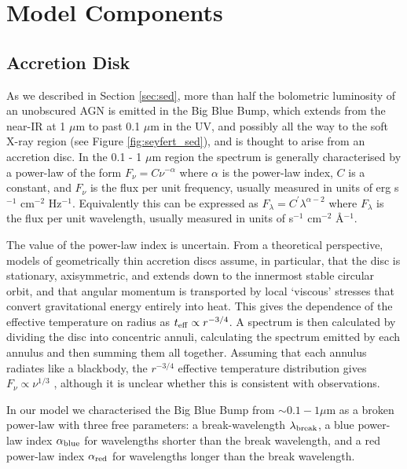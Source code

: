 \section{Model Components}

\subsection{Accretion Disk}

As we described in Section \ref{sec:sed}, more than half the bolometric luminosity of an unobscured AGN is emitted in the Big Blue Bump, which extends from the near-IR at 1 $\mu$m to past 0.1 $\mu$m in the UV, and possibly all the way to the soft X-ray region (see Figure \ref{fig:seyfert_sed}), and is thought to arise from an accretion disc. In the 0.1 - 1 $\mu$m region the spectrum is generally characterised by a power-law of the form $F_\nu = C\nu^{-\alpha}$ where $\alpha$ is the power-law index, $C$ is a constant, and $F_\nu$ is the flux per unit frequency, usually measured in units of erg s$^{-1}$ cm$^{-2}$ Hz$^{-1}$. Equivalently this can be expressed as $F_\lambda = C^\prime\lambda^{\alpha - 2}$ where $F_\lambda$ is the flux per unit wavelength, usually measured in units of s$^{-1}$ cm$^{-2}$ \AA$^{-1}$. 

The value of the power-law index is uncertain. From a theoretical perspective, models of geometrically thin accretion discs \citep{shakura73} assume, in particular, that the disc is stationary, axisymmetric, and extends down to the innermost stable circular orbit, and that angular momentum is transported by local `viscous' stresses that convert gravitational energy entirely into heat. This gives the dependence of the effective temperature on radius as $t_{\rm eff} \propto r^{-3/4}$. A spectrum is then calculated by dividing the disc into concentric annuli, calculating the spectrum emitted by each annulus and then summing them all together. Assuming that each annulus radiates like a blackbody, the $r^{-3/4}$ effective temperature distribution gives $F_\nu \propto \nu^{1/3}$ \citep{peterson95}, although it is unclear whether this is consistent with observations.    

In our model we characterised the Big Blue Bump from $\sim 0.1 - 1 \mu$m as a broken power-law with three free parameters: a break-wavelength $\lambda_{\rm break}$, a blue power-law index $\alpha_{\rm blue}$ for wavelengths shorter than the break wavelength, and a red power-law index $\alpha_{\rm red}$ for wavelengths longer than the break wavelength.   

